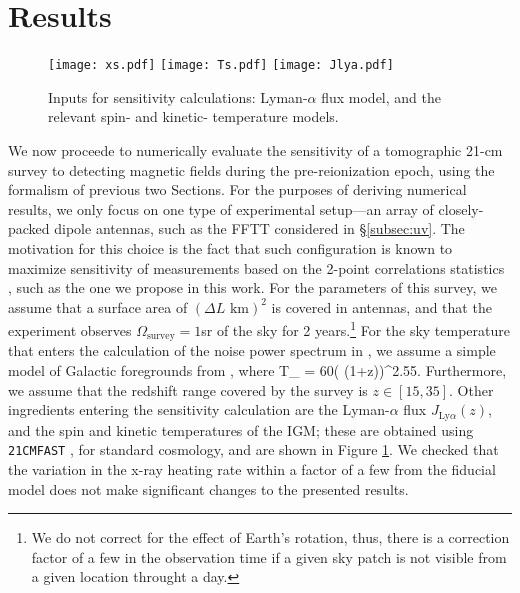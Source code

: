 \section{Results}
\label{sec:results}

\begin{figure}
\centering
\texttt{[image: xs.pdf]}
\texttt{[image: Ts.pdf]}
\texttt{[image: Jlya.pdf]}
\caption{Inputs for sensitivity calculations: Lyman-$\alpha$ flux model, and the relevant spin- and kinetic- temperature models. \label{fig:cosmo}}
\end{figure}
We now proceede to numerically evaluate the sensitivity of a tomographic 21-cm survey to detecting magnetic fields during the pre-reionization epoch, using the formalism of previous two Sections. For the purposes of deriving numerical results, we only focus on one type of experimental setup---an array of closely-packed dipole antennas, such as the FFTT considered in \S\ref{subsec:uv}. The motivation for this choice is the fact that such configuration is known to maximize sensitivity of measurements based on the 2-point correlations statistics \cite{2009PhRvD..79h3530T}, such as the one we propose in this work. For the parameters of this survey, we assume that a surface area of $(\Delta L\text{ km})^2$ is covered in antennas, and that the experiment observes $\Omega_\text{survey}=1$sr of the sky for 2 years.\footnote{We do not correct for the effect of Earth's rotation, thus, there is a correction factor of a few in the observation time if a given sky patch is not visible from a given location throught a day.} For the sky temperature that enters the calculation of the noise power spectrum in \eq{\ref{eq:Pnoise_K}}, we assume a simple model of Galactic foregrounds from \cite{2008PhRvD..78b3529M}, where
\beq
T_  = 60\left( (1+z)\right)^{2.55}\text{   [K]}.
\label{eq:tsys}
\eeq
Furthermore, we assume that the redshift range covered by the survey is $z\in[15,35]$.  Other ingredients entering the sensitivity calculation are the Lyman-$\alpha$ flux $J_{\text{Ly}\alpha}(z)$, and the spin and kinetic temperatures of the IGM; these are obtained using \texttt{21CMFAST} \cite{2011MNRAS.411..955M}, for standard cosmology, and are shown in Figure \ref{fig:cosmo}. We checked that the variation in the x-ray heating rate within a factor of a few from the fiducial model does not make significant changes to the presented results.

